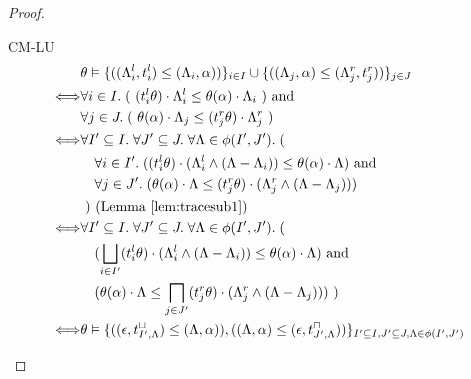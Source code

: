 {{{\begin{proof}
\begin{ProofEnumDesc}
\item[CM-LU]
\begin{align*}
&\theta \vDash \{((\Lambda_i^l,t_i^l)\leq(\Lambda_i,\alpha))\}_{i\in I} \cup \{((\Lambda_j,\alpha)\leq(\Lambda_j^r,t_j^r))\}_{j\in J} \\
\Longleftrightarrow & \forall i \in I.\;  (~ (t_i^l\theta)\cdot \Lambda_i^l \leq \theta(\alpha) \cdot \Lambda_{i}  ~)  \text{ and }  \\
&\forall j \in J.\;  (~ \theta(\alpha) \cdot \Lambda_{j}  \leq (t_j^r\theta)\cdot \Lambda_j^r ~) \\
\Longleftrightarrow & \forall I' \subseteq I.\; \forall J' \subseteq J.\; \forall \Lambda \in \phi(I', J'). \; (~\\
& \quad \forall i \in I'.\; ((t_i^l\theta)\cdot(\Lambda_i^l \land (\Lambda -\Lambda_{i})) \leq \theta(\alpha)\cdot \Lambda )\text{ and }\\
& \quad\forall j \in J'.\; (\theta(\alpha)\cdot \Lambda \leq  (t_j^r\theta)\cdot(\Lambda_j^r \land (\Lambda -\Lambda_{j})))~\\
&~)~\text{(Lemma \ref{lem:tracesub1})} \\
\Longleftrightarrow & \forall I' \subseteq I.\; \forall J' \subseteq J.\; \forall \Lambda \in \phi(I', J'). \; (~\\
& \quad ( \bigsqcup_{i\in I'} (t_i^l\theta)\cdot(\Lambda_i^l \land (\Lambda -\Lambda_{i})) \leq \theta(\alpha)\cdot \Lambda )\text{ and}\\
& \quad (\theta(\alpha)\cdot \Lambda \leq  \bigsqcap_{j\in J'}(t_j^r\theta)\cdot(\Lambda_j^r \land (\Lambda -\Lambda_{j})))~)\\
\Longleftrightarrow & \theta \vDash \{((\epsilon,t_{I',\Lambda}^{\sqcup})\leq(\Lambda,\alpha)), ((\Lambda,\alpha)\leq(\epsilon,t_{J',\Lambda}^{\sqcap}))\}_{I'\subseteq I, J'\subseteq J, \Lambda \in \phi(I', J') }
\end{align*}
\end{ProofEnumDesc}
\end{proof}

}}}
